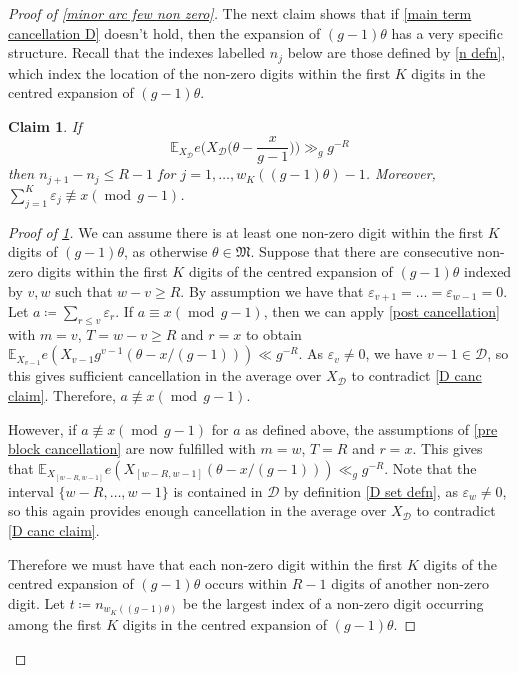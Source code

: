 \documentclass[hidelinks,11pt,reqno]{amsart}
\renewcommand{\leq}{\leqslant}
\renewcommand{\geq}{\geqslant}
\newcommand{\E}{\ensuremath{\mathbb{E}}}
\newcommand{\xb}{X}
\newcommand{\xbd}{X_{\mathcal{D}}}
\newcommand{\nequiv}{\not\equiv}
\newtheorem{claim}[prop]{Claim}
\theoremstyle{remark}
\newcommand{\md}[1]{\ensuremath{(\operatorname{mod}\, #1)}}
\begin{document}
\begin{proof}[Proof of \cref{minor arc few non zero}]
The next claim shows that if \cref{main term cancellation D} doesn't hold, then the expansion of $(g-1)\theta$ has a very specific structure. Recall that the indexes labelled $n_{j}$ below are those defined by \cref{n defn}, which index the location of the non-zero digits within the first $K$ digits in the centred expansion of $(g-1)\theta$.
        \begin{claim}\label{no D canc} 
        If 
        \begin{equation}\label{D canc claim}
            \E_{\xbd}e\Big (\xbd\Big ( \theta-\frac{x}{g-1}\Big )\Big)\gg_{g} g^{-R}
        \end{equation}
       then $n_{j+1}-n_{j}\leq R-1 $ for $j=1,\ldots, w_{K}((g-1)\theta)-1$. Moreover, $\sum_{j=1}^{K}\varepsilon_{j}\nequiv x \md{g-1}$. 
    \end{claim}
    \begin{proof}[Proof of \cref{no D canc}]
We can assume there is at least one non-zero digit within the first $K$ digits of $(g-1)\theta$, as otherwise $\theta\in \mathfrak{M}$. Suppose that there are consecutive non-zero digits within the first $K$ digits of the centred expansion of $(g-1)\theta$ indexed by $v,w$ such that $w-v\geq R$. By assumption we have that $\varepsilon_{v+1}=\ldots= \varepsilon_{w-1}=0$. Let $a\coloneq \sum_{r\leq v}\varepsilon_{r}$. If $a\equiv x\md{g-1}$, then we can apply \cref{post cancellation} with $m=v$, $T=w-v\geq R$ and $r=x$ to obtain $\E_{X_{v-1}}e(X_{v-1}g^{v-1} ( \theta-x/(g-1) ))\ll g^{-R}$. As $\varepsilon_{v}\neq 0$, we have $v-1\in \mathcal{D}$, so this gives sufficient cancellation in the average over $\xbd$ to contradict \cref{D canc claim}. Therefore, $a\nequiv x\md{g-1}$. 
        
However, if $a\nequiv x\md{g-1}$ for $a$ as defined above, the assumptions of \cref{pre block cancellation} are now fulfilled with $m=w$, $T=R$ and $r=x$. This gives that $\E_{\xb_{[w-R,w-1]}}e(\xb_{[w-R,w-1]} ( \theta-x/(g-1) ))\ll_{g} g^{-R}$. Note that the interval $\{w-R,\ldots, w-1\}$ is contained in $\mathcal{D}$ by definition \cref{D set defn}, as $\varepsilon_{w}\neq 0$, so this again provides enough cancellation in the average over $\xbd$ to contradict \cref{D canc claim}.

Therefore we must have that each non-zero digit within the first $K$ digits of the centred expansion of $(g-1)\theta$ occurs within $R-1$ digits of another non-zero digit. Let $t\coloneq n_{w_{K}((g-1)\theta)}$ be the largest index of a non-zero digit occurring among the first $K$ digits in the centred expansion of $(g-1)\theta$.


\end{proof}
\end{proof}
\end{document}
